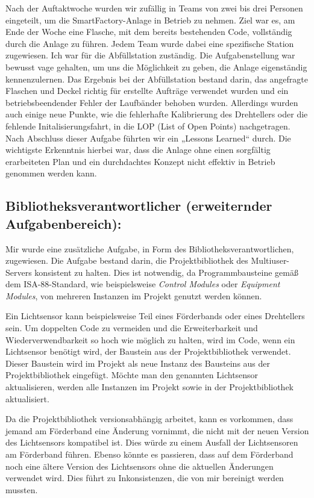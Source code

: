 Nach der Auftaktwoche wurden wir zufällig in Teams von zwei bis drei Personen eingeteilt, um die SmartFactory-Anlage 
in Betrieb zu nehmen. Ziel war es, am Ende der Woche eine Flasche, mit dem bereits bestehenden Code, vollständig durch 
die Anlage zu führen. Jedem Team wurde dabei eine spezifische Station zugewiesen. Ich war für die Abfüllstation zuständig. 
Die Aufgabenstellung war bewusst vage gehalten, um uns die Möglichkeit zu geben, die Anlage eigenständig kennenzulernen. 
Das Ergebnis bei der Abfüllstation bestand darin, das angefragte Flaschen und Deckel richtig für erstellte Aufträge 
verwendet wurden und ein betriebsbeendender Fehler der Laufbänder behoben wurden. Allerdings wurden auch einige neue Punkte, 
wie die fehlerhafte Kalibrierung des Drehtellers oder die fehlende Initalisierungsfahrt, in die LOP (List of Open Points) 
nachgetragen. Nach Abschluss dieser Aufgabe führten wir ein „Lessons Learned“ durch. Die wichtigste Erkenntnis hierbei war, 
dass die Anlage ohne einen sorgfältig erarbeiteten Plan und ein durchdachtes Konzept nicht effektiv in Betrieb 
genommen werden kann.
\subsection{Bibliotheksverantwortlicher (erweiternder Aufgabenbereich):} 

Mir wurde eine zusätzliche Aufgabe, in Form des Bibliotheksverantwortlichen, zugewiesen. Die Aufgabe bestand darin, 
die Projektbibliothek des Multiuser-Servers konsistent zu halten. Dies ist notwendig, da Programmbausteine gemäß dem 
ISA-88-Standard, wie beispielsweise \textit{Control Modules} oder \textit{Equipment Modules}, von mehreren Instanzen im 
Projekt genutzt werden können.

Ein Lichtsensor kann beispielsweise Teil eines Förderbands oder eines Drehtellers sein. Um doppelten Code zu vermeiden und 
die Erweiterbarkeit und Wiederverwendbarkeit so hoch wie möglich zu halten, wird im Code, wenn ein Lichtsensor benötigt wird, der Baustein aus der 
Projektbibliothek verwendet. Dieser Baustein wird im Projekt als neue Instanz des Bausteins aus der Projektbibliothek 
eingefügt. Möchte man den genannten Lichtsensor aktualisieren, werden alle Instanzen im Projekt sowie in der 
Projektbibliothek aktualisiert.

Da die Projektbibliothek versionsabhängig arbeitet, kann es vorkommen, dass jemand am Förderband eine Änderung vornimmt, die 
nicht mit der neuen Version des Lichtsensors kompatibel ist. Dies würde zu einem Ausfall der Lichtsensoren am Förderband 
führen. Ebenso könnte es passieren, dass auf dem Förderband noch eine ältere Version des Lichtsensors ohne die aktuellen 
Änderungen verwendet wird. Dies führt zu Inkonsistenzen, die von mir bereinigt werden mussten.
